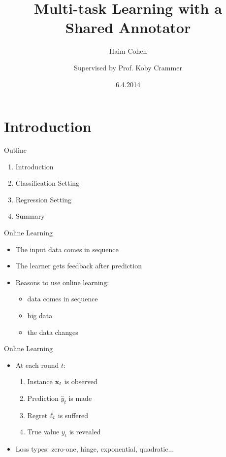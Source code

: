 \documentclass{beamer}
\title []{Multi-task Learning with a  \\Shared Annotator}    %
\author [H. Cohen and K. Crammer]{Haim Cohen \and \newline\newline  Supervised by Prof. Koby Crammer\newline\newline
}
\institute [Technion]{Faculty of Electrical Engineering, Technion\\
Israel Institute of Technology}
\date[April 6th, 2014]{6.4.2014}
\begin{document}
\maketitle
\section{Introduction}

\begin{frame}{Outline}
\begin{enumerate}
\item Introduction\newline
\item Classification Setting\newline
\item Regression Setting\newline
\item Summary
\end{enumerate}
\end{frame}


\begin{frame}{Online Learning}
\begin{itemize}
\item The input data comes in sequence \newline
\item The learner gets feedback after prediction  \newline   
\item  Reasons to use online learning: \newline
\begin{itemize}
\item data comes in sequence \newline
\item big data \newline
\item the data changes \newline
\end{itemize}
\end{itemize}
\end{frame}


\begin{frame}{Online Learning}
\begin{itemize}
\item At each round $t$:\newline
\begin{enumerate}
\item Instance $\mathbf{x}_{t}$ is observed\newline
\item Prediction $\hat{y}_t$ is made\newline
\item Regret $\ell_{t}$ is suffered\newline
\item True value $y_t$ is revealed\newline
\end{enumerate}
\item Loss types: zero-one, hinge, exponential, quadratic...
\end{itemize}
\end{frame}
\end{document}
